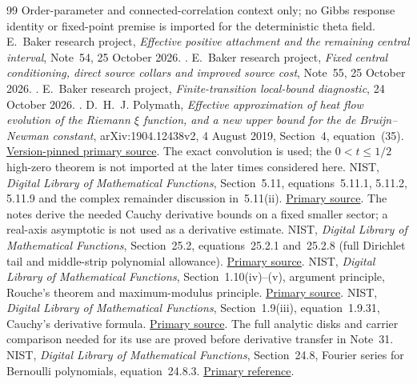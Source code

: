 \begin{thebibliography}{99}
Order-parameter and connected-correlation context only; no Gibbs response
identity or fixed-point premise is imported for the deterministic theta field.
E.~Baker research project, \emph{Effective positive attachment and the
remaining central interval}, Note~54, 25 October 2026.
.
E.~Baker research project, \emph{Fixed central conditioning, direct source
collars and improved source cost}, Note~55, 25 October 2026.
.
E.~Baker research project, \emph{Finite-transition local-bound diagnostic},
24 October 2026.
.
D.~H.~J. Polymath, \emph{Effective approximation of heat flow evolution
of the Riemann $\xi$ function, and a new upper bound for the
 de Bruijn--Newman constant}, arXiv:1904.12438v2, 4 August 2019,
Section~4, equation~(35).
\href{https://arxiv.org/abs/1904.12438v2}{Version-pinned primary source}.
The exact convolution is used; the $0<t\le1/2$ high-zero theorem is not
imported at the later times considered here.
NIST, \emph{Digital Library of Mathematical Functions}, Section~5.11,
equations~5.11.1, 5.11.2, 5.11.9 and the complex remainder discussion
in~5.11(ii). \href{https://dlmf.nist.gov/5.11}{Primary source}.
The notes derive the needed Cauchy derivative bounds on a fixed smaller
sector; a real-axis asymptotic is not used as a derivative estimate.
NIST, \emph{Digital Library of Mathematical Functions}, Section~25.2,
equations~25.2.1 and~25.2.8 (full Dirichlet tail and middle-strip
polynomial allowance). \href{https://dlmf.nist.gov/25.2}{Primary source}.
NIST, \emph{Digital Library of Mathematical Functions}, Section~1.10(iv)--(v),
argument principle, Rouche's theorem and maximum-modulus principle.
\href{https://dlmf.nist.gov/1.10}{Primary source}.
NIST, \emph{Digital Library of Mathematical Functions},
Section~1.9(iii), equation~1.9.31, Cauchy's derivative formula.
\href{https://dlmf.nist.gov/1.9.E31}{Primary source}.
The full analytic disks and carrier comparison needed for its use are
proved before derivative transfer in Note~31.
NIST, \emph{Digital Library of Mathematical Functions},
Section~24.8, Fourier series for Bernoulli polynomials, equation~24.8.3.
\href{https://dlmf.nist.gov/24.8.E3}{Primary reference}.

\end{thebibliography}
